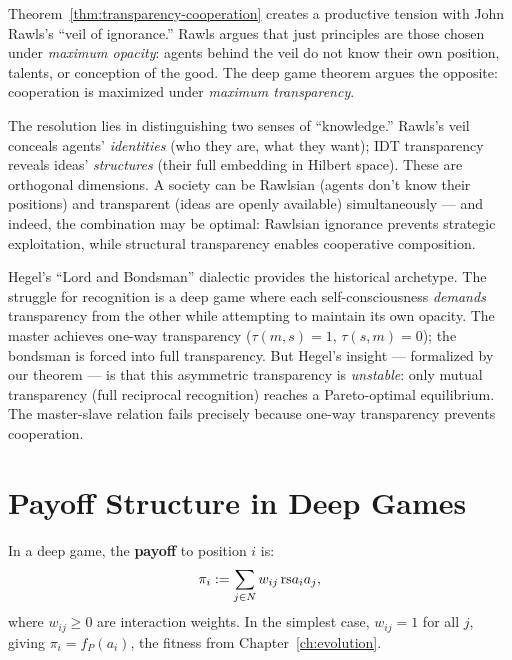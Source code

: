 \begin{interpretation}
\label{interp:ch20:rawls_veil}
Theorem~\ref{thm:transparency-cooperation} creates a productive tension
with John Rawls's ``veil of ignorance.''  Rawls argues that just principles
are those chosen under \emph{maximum opacity}: agents behind the veil do
not know their own position, talents, or conception of the good.  The
deep game theorem argues the opposite: cooperation is maximized under
\emph{maximum transparency}.

The resolution lies in distinguishing two senses of ``knowledge.''  Rawls's
veil conceals agents' \emph{identities} (who they are, what they want);
IDT transparency reveals ideas' \emph{structures} (their full embedding
in Hilbert space).  These are orthogonal dimensions.  A society can be
Rawlsian (agents don't know their positions) and transparent (ideas are
openly available) simultaneously --- and indeed, the combination may be
optimal: Rawlsian ignorance prevents strategic exploitation, while
structural transparency enables cooperative composition.

Hegel's ``Lord and Bondsman'' dialectic provides the historical archetype.
The struggle for recognition is a deep game where each self-consciousness
\emph{demands} transparency from the other while attempting to maintain
its own opacity.  The master achieves one-way transparency ($\tau(m,s) = 1$,
$\tau(s,m) = 0$); the bondsman is forced into full transparency.  But
Hegel's insight --- formalized by our theorem --- is that this asymmetric
transparency is \emph{unstable}: only mutual transparency (full reciprocal
recognition) reaches a Pareto-optimal equilibrium.  The master-slave
relation fails precisely because one-way transparency prevents cooperation.
\end{interpretation}

\section{Payoff Structure in Deep Games}

\begin{definition}
\label{def:deep-payoff}
In a deep game, the \textbf{payoff} to position $i$ is:
\[
  \pi_i := \sum_{j \in N} w_{ij}\, \mathrm{rs}{a_i}{a_j},
\]
where $w_{ij} \geq 0$ are interaction weights.  In the simplest case,
$w_{ij} = 1$ for all $j$, giving $\pi_i = f_P(a_i)$, the fitness from
Chapter~\ref{ch:evolution}.
\end{definition}

